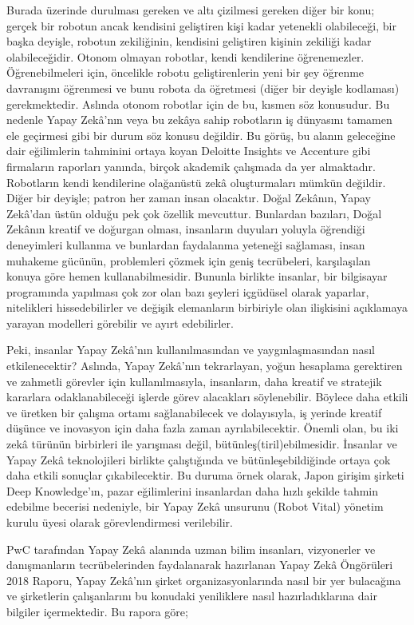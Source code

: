 \documentclass{article}
\begin{document}
\begin{multicols}{2}
Burada üzerinde durulması gereken ve altı çizilmesi gereken diğer bir konu;
gerçek bir robotun ancak kendisini geliştiren kişi kadar yetenekli olabileceği,
bir başka deyişle, robotun zekiliğinin, kendisini geliştiren kişinin zekiliği kadar
olabileceğidir. Otonom olmayan robotlar, kendi kendilerine öğrenemezler. Öğrenebilmeleri için, öncelikle robotu geliştirenlerin yeni bir şey öğrenme davranışını öğrenmesi ve bunu robota da öğretmesi (diğer bir deyişle kodlaması)
gerekmektedir. Aslında otonom robotlar için de bu, kısmen söz konusudur. Bu
nedenle Yapay Zekâ’nın veya bu zekâya sahip robotların iş dünyasını tamamen
ele geçirmesi gibi bir durum söz konusu değildir. Bu görüş, bu alanın geleceğine
dair eğilimlerin tahminini ortaya koyan Deloitte Insights ve Accenture gibi firmaların raporları yanında, birçok akademik çalışmada da yer almaktadır. Robotların kendi kendilerine olağanüstü zekâ oluşturmaları mümkün değildir. Diğer
bir deyişle; patron her zaman insan olacaktır.
Doğal Zekânın, Yapay Zekâ’dan üstün olduğu pek çok özellik mevcuttur. Bunlardan bazıları, Doğal Zekânın kreatif ve doğurgan olması, insanların duyuları
yoluyla öğrendiği deneyimleri kullanma ve bunlardan faydalanma yeteneği sağlaması, insan muhakeme gücünün, problemleri çözmek için geniş tecrübeleri,
karşılaşılan konuya göre hemen kullanabilmesidir. Bununla birlikte insanlar, bir
bilgisayar programında yapılması çok zor olan bazı şeyleri içgüdüsel olarak yaparlar, nitelikleri hissedebilirler ve değişik elemanların birbiriyle olan ilişkisini
açıklamaya yarayan modelleri görebilir ve ayırt edebilirler.

Peki, insanlar Yapay Zekâ’nın kullanılmasından ve yaygınlaşmasından nasıl etkilenecektir? Aslında, Yapay Zekâ’nın tekrarlayan, yoğun hesaplama gerektiren
ve zahmetli görevler için kullanılmasıyla, insanların, daha kreatif ve stratejik kararlara odaklanabileceği işlerde görev alacakları söylenebilir. Böylece daha etkili
ve üretken bir çalışma ortamı sağlanabilecek ve dolayısıyla, iş yerinde kreatif
düşünce ve inovasyon için daha fazla zaman ayrılabilecektir. Önemli olan, bu iki
zekâ türünün birbirleri ile yarışması değil, bütünleş(tiril)ebilmesidir. İnsanlar ve
Yapay Zekâ teknolojileri birlikte çalıştığında ve bütünleşebildiğinde ortaya çok
daha etkili sonuçlar çıkabilecektir. Bu duruma örnek olarak, Japon girişim şirketi Deep Knowledge’ın, pazar eğilimlerini insanlardan daha hızlı şekilde tahmin
edebilme becerisi nedeniyle, bir Yapay Zekâ unsurunu (Robot Vital) yönetim
kurulu üyesi olarak görevlendirmesi verilebilir.

\end{multicols}
\newpage
PwC tarafından Yapay Zekâ alanında uzman bilim insanları, vizyonerler ve
danışmanların tecrübelerinden faydalanarak hazırlanan Yapay Zekâ Öngörüleri
2018 Raporu, Yapay Zekâ’nın şirket organizasyonlarında nasıl bir yer bulacağına
ve şirketlerin çalışanlarını bu konudaki yeniliklere nasıl hazırladıklarına dair bilgiler içermektedir. Bu rapora göre;
\end{document}
